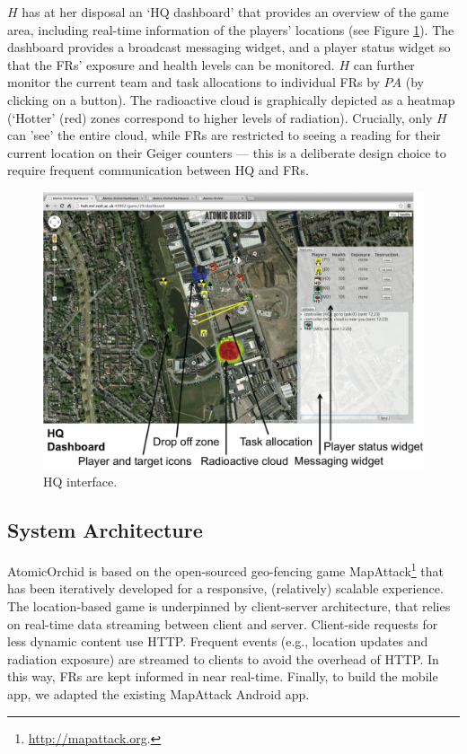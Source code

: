 $H$ has at her disposal an `HQ dashboard' that provides an over\-view of the game area, including real-time information of the players' locations (see Figure \ref{fig:ui2}). The dashboard provides a broadcast messaging widget, and a player status widget so that the FRs' exposure and health levels can be monitored. $H$ can further monitor the  current team and task allocations to individual FRs by $PA$ (by clicking on a button). The radioactive cloud  is graphically depicted as a heatmap (`Hotter'  (red) zones correspond to higher levels of radiation). Crucially, only  $H$ can 'see' the entire cloud, while FRs are restricted to seeing a reading for their current location on their Geiger counters --- this is a deliberate design choice to require frequent communication between HQ and FRs. 
\begin{figure}[htbp]
\includegraphics[width=\columnwidth]{dashboard.png}
\caption{HQ interface.}
\label{fig:ui2}
\end{figure}

\subsection{System Architecture}
\noindent AtomicOrchid is based on the open-sourced geo-fencing game MapAttack\footnote{\url{http://mapattack.org}.} that has been iteratively developed for a responsive, (relatively) scalable experience.  The location-based game is underpinned by client-server architecture, that relies on real-time data streaming between client and server. Client-side requests for less dynamic content use HTTP. Frequent events (e.g., location updates and radiation exposure) are streamed to clients to avoid the overhead of HTTP. In this way, FRs are kept informed in near real-time. Finally,  to build the mobile app, we adapted the existing MapAttack Android app.

